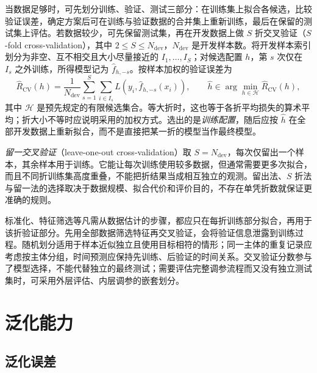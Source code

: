 当数据足够时，可先划分训练、验证、测试三部分：在训练集上拟合各候选，比较验证误差，确定方案后可在训练与验证数据的合并集上重新训练，最后在保留的测试集上评估。若数据较少，可先保留测试集，再在开发数据上做 $S$ 折交叉验证（$S$-fold cross-validation），其中 $2\leq S\leq N_{\mathrm{dev}}$，$N_{\mathrm{dev}}$ 是开发样本数。将开发样本索引划分为非空、互不相交且大小尽量接近的 $I_1,\ldots,I_S$；对候选配置 $h$，第 $s$ 次仅在 $I_s$ 之外训练，所得模型记为 $\widehat f_{h,-s}$。按样本加权的验证误差为
\begin{equation}
    \widehat R_{\mathrm{CV}}(h)
       =\frac1{N_{\mathrm{dev}}}\sum_{s=1}^S\sum_{i\in I_s}
          L(y_i,\widehat f_{h,-s}(x_i)),
    \qquad
    \widehat h\in\arg\min_{h\in\mathcal H}\widehat R_{\mathrm{CV}}(h),
    \label{eq:lh-cross-validation}
\end{equation}
其中 $\mathcal H$ 是预先规定的有限候选集合。等大折时，这也等于各折平均损失的算术平均；折大小不等时应说明采用的加权方式。选出的是\emph{训练配置}，随后应按 $\widehat h$ 在全部开发数据上重新拟合，而不是直接把某一折的模型当作最终模型。

\emph{留一交叉验证}（leave-one-out cross-validation）取 $S=N_{\mathrm{dev}}$，每次仅留出一个样本，其余样本用于训练。它能让每次训练使用较多数据，但通常需要更多次拟合，而且不同折训练集高度重叠，不能把折结果当成相互独立的观测。留出法、$S$ 折法与留一法的选择取决于数据规模、拟合代价和评价目的，不存在单凭折数就保证更准确的规则。

\begin{notealert}[type=caution,title={验证对象应包含整个训练流程}]
标准化、特征筛选等凡需从数据估计的步骤，都应只在每折训练部分拟合，再用于该折验证部分。先用全部数据筛选特征再交叉验证，会将验证信息泄露到训练过程。随机划分适用于样本近似独立且使用目标相符的情形；同一主体的重复记录应考虑按主体分组，时间预测应保持先训练、后验证的时间关系。交叉验证分数参与了模型选择，不能代替独立的最终测试；需要评估完整调参流程而又没有独立测试集时，可采用外层评估、内层调参的嵌套划分。
\end{notealert}

\section{泛化能力}
\label{sec:lh-generalization}

\subsection{泛化误差}
\label{subsec:lh-generalization-error}

